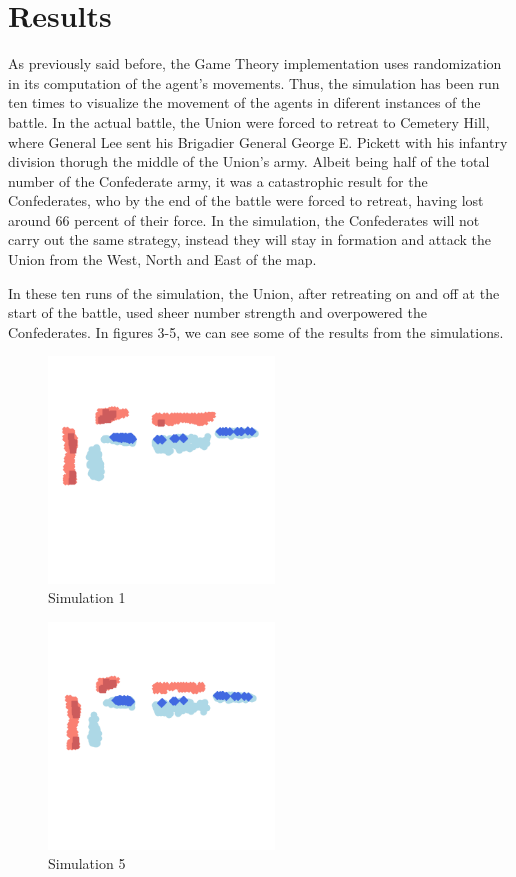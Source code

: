 \documentclass[final,5p,times,twocolumn,authoryear]{elsarticle}
\begin{document}
\section{Results}

As previously said before, the Game Theory implementation uses randomization in its computation of the agent's movements. Thus, the simulation has been run ten times to visualize the movement of the agents in diferent instances of the battle. In the actual battle, the Union were forced to retreat to Cemetery Hill, where General Lee sent his Brigadier General George E. Pickett with his infantry division thorugh the middle of the Union's army. Albeit being half of the total number of the Confederate army, it was a catastrophic result for the Confederates, who by the end of the battle were forced to retreat, having lost around 66 percent of their force. In the simulation, the Confederates will not carry out the same strategy, instead they will stay in formation and attack the Union from the West, North and East of the map.

In these ten runs of the simulation, the Union, after retreating on and off at the start of the battle, used sheer number strength and overpowered the Confederates. In figures 3-5, we can see some of the results from the simulations.

\begin{figure}[!ht]
  \centering
      \includegraphics[width=6cm]{Battle_1.png}
      \caption{Simulation 1}
      \label{fig:Simulation}
  \centering
\end{figure}

\begin{figure}[!ht]
  \centering
      \includegraphics[width=6cm]{Battle_2.png}
      \caption{Simulation 5}
      \label{fig:Simulation}
  \centering
\end{figure}
\end{document}
